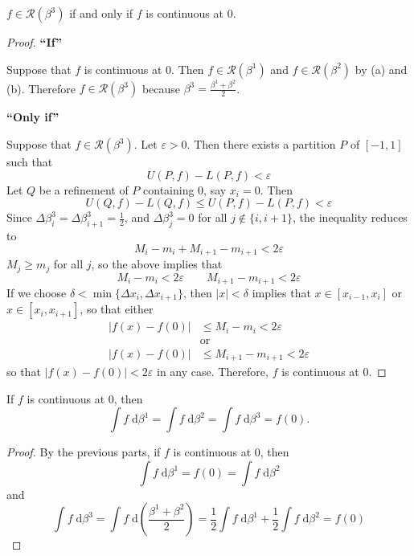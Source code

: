 \documentclass{homework}
\begin{document}
\begin{alphaparts}
		\questionpart  %
		$f \in \mathscr{R}(\beta^3)$ if and only if $f$ is continuous at $0$.
		
		\begin{proof}
			\textbf{``If''}
			
			Suppose that $f$ is continuous at $0$. Then $f \in \mathscr{R}(\beta^1)$ and $f \in \mathscr{R}(\beta^2)$ by (a) and (b). Therefore $f \in \mathscr{R}(\beta^3)$ because $\beta^3 = \frac{\beta^1 +\beta^2}{2}$.
			
			\textbf{``Only if''}
			
			Suppose that $f \in \mathscr{R}(\beta^3)$. Let $\varepsilon > 0$. Then there exists a partition $P$ of $[-1,1]$ such that
			$$
			U(P,f) - L(P, f) < \varepsilon
			$$
			Let $Q$ be a refinement of $P$ containing $0$, say $x_i = 0$. Then
			$$
			U(Q, f) - L(Q,f) \le U(P,f) - L(P,f) < \varepsilon
			$$
			Since $\Delta \beta^3_i = \Delta \beta^3_{i+1} = \frac{1}{2}$, and $\Delta \beta^3_j = 0$ for all $j \notin \{i, i+1\}$, the inequality reduces to
			$$
			M_i - m_i + M_{i+1} - m_{i+1} < 2\varepsilon
			$$
			$M_j \ge m_{j}$ for all $j$, so the above implies that
			$$
			M_i - m_i < 2\varepsilon \qquad M_{i+1} - m_{i+1} < 2\varepsilon
			$$
			If we choose $\delta < \min\{\Delta x_i, \Delta x_{i+1}\}$, then $|x| < \delta$ implies that $x \in [x_{i-1}, x_i]$ or $x\in[x_i, x_{i+1}]$, so that either
			$$
			\begin{aligned}
				|f(x) - f(0)| &\le M_i - m_i < 2\varepsilon\\
				&\text{or}\\
				|f(x) - f(0)| &\le M_{i+1} - m_{i+1} < 2\varepsilon
			\end{aligned}
			$$
			so that $|f(x) - f(0)| < 2\varepsilon$ in any case. Therefore, $f$ is continuous at $0$.
		\end{proof}
		
		\questionpart
		
		If $f$ is continuous at $0$, then
		$$
		\int f \;\text{d}\beta^1 = \int f \;\text{d}\beta^2 = \int f \;\text{d}\beta^3 = f(0).
		$$
		\begin{proof}
			By the previous parts, if $f$ is continuous at $0$, then
			$$
			\int f \;\text{d}\beta^1 = f(0) = \int f\;\text{d}\beta^2
			$$
			and
			$$
			\int f \;\text{d}\beta^3 = \int f \;\text{d}\left(\frac{\beta^1 + \beta^2}{2}\right) = \frac{1}{2}\int f\;\text{d}\beta^1 + \frac{1}{2}\int f\;\text{d}\beta^2 = f(0)
		$$
		\end{proof}
		
	\end{alphaparts}
	
\end{document}
